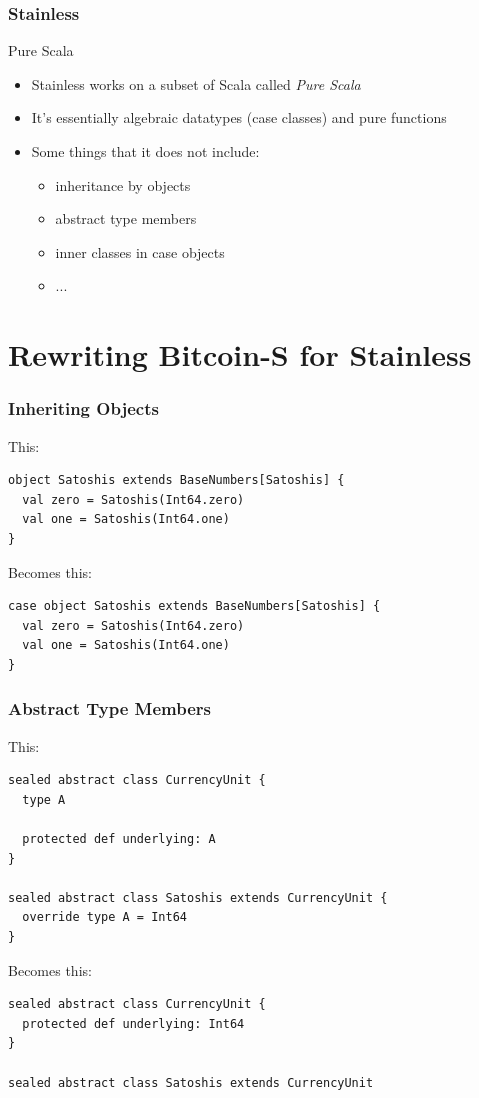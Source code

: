 \documentclass{beamer}
\begin{document}
\begin{frame}
\frametitle{Stainless}
\begin{block}{Pure Scala}
\begin{itemize}
  \item Stainless works on a subset of Scala called \emph{Pure Scala}
  \item It's essentially algebraic datatypes (case classes) and pure functions
  \item Some things that it does not include:
    \begin{itemize}
    \item inheritance by objects
    \item abstract type members
    \item inner classes
      in case objects
    \item ...
\end{itemize}

\end{itemize}
\end{block}
\end{frame}


\section{Rewriting Bitcoin-S for Stainless}



\begin{frame}[fragile]
\frametitle{Inheriting Objects}
This:
\begin{lstlisting}[style=scala]
object Satoshis extends BaseNumbers[Satoshis] {
  val zero = Satoshis(Int64.zero)
  val one = Satoshis(Int64.one)
}
\end{lstlisting}

Becomes this:
\begin{lstlisting}[style=scala]
case object Satoshis extends BaseNumbers[Satoshis] {
  val zero = Satoshis(Int64.zero)
  val one = Satoshis(Int64.one)
}
\end{lstlisting}
\end{frame}


\begin{frame}[fragile]
\frametitle{Abstract Type Members}
This:
\begin{lstlisting}[style=scala]
sealed abstract class CurrencyUnit {
  type A

  protected def underlying: A
}

sealed abstract class Satoshis extends CurrencyUnit {
  override type A = Int64
}
\end{lstlisting}

Becomes this:
\begin{lstlisting}[style=scala]
sealed abstract class CurrencyUnit {
  protected def underlying: Int64
}

sealed abstract class Satoshis extends CurrencyUnit
\end{lstlisting}
\end{frame}
\end{document}

